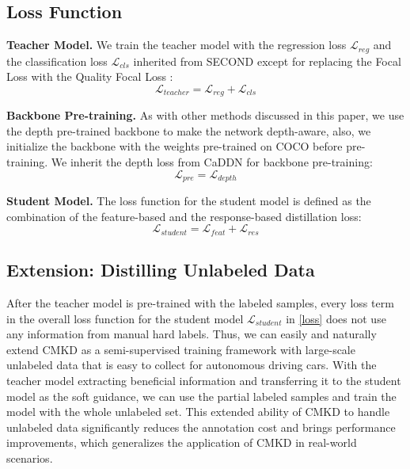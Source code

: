\documentclass[runningheads]{llncs}
\begin{document}
\subsection{Loss Function}
\textbf{Teacher Model.}
We train the teacher model with the regression loss $\mathcal{L}_{reg}$ and the classification loss $\mathcal{L}_{cls}$ inherited from SECOND \cite{second} except for replacing the Focal Loss \cite{lin2017focal} with the Quality Focal Loss \cite{gfl}:
\begin{equation}
    \mathcal{L}_{teacher} = \mathcal{L}_{reg} + \mathcal{L}_{cls}
\end{equation}

\noindent\textbf{Backbone Pre-training.}
As with other methods discussed in this paper, we use the depth pre-trained backbone to make the network depth-aware, also, we initialize the backbone with the weights pre-trained on COCO \cite{lin2014microsoftcoco} before pre-training.
We inherit the depth loss from CaDDN \cite{CADDN} for backbone pre-training:
\begin{equation}
    \mathcal{L}_{pre} = \mathcal{L}_{depth}
\end{equation}

\noindent\textbf{Student Model.}
The loss function for the student model is defined as the combination of the feature-based and the response-based distillation loss:
\begin{equation}
    \mathcal{L}_{student} = \mathcal{L}_{feat} + \mathcal{L}_{res}
    \label{loss}
\end{equation}


\subsection{Extension: Distilling Unlabeled Data}
\label{extend}
After the teacher model is pre-trained with the labeled samples, every loss term in the overall loss function for the student model $\mathcal{L}_{student}$ in \cref{loss} does not use any information from manual hard labels.
Thus, we can easily and naturally extend CMKD as a semi-supervised training framework with large-scale unlabeled data that is easy to collect for autonomous driving cars. 
With the teacher model extracting beneficial information and transferring it to the student model as the soft guidance, we can use the partial labeled samples and train the model with the whole unlabeled set.
This extended ability of CMKD to handle unlabeled data significantly reduces the annotation cost and brings performance improvements, which generalizes the application of CMKD in real-world scenarios.
\end{document}
